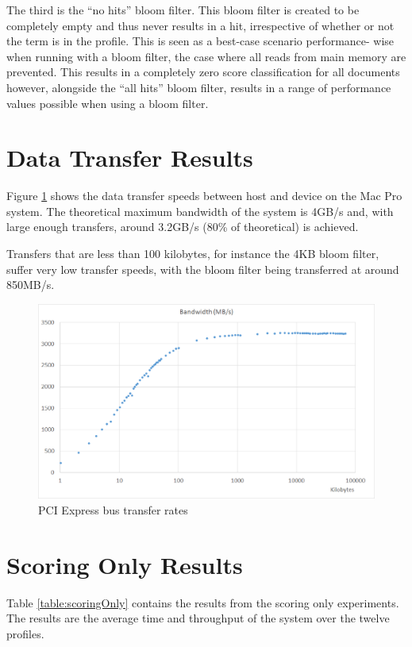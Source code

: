 The third is the ``no hits'' bloom filter. This bloom filter is created to be
completely empty and thus never results in a hit, irrespective of whether or not
the term is in the profile. This is seen as a best-case scenario performance-
wise when running with a bloom filter, the case where all reads from main memory
are prevented. This results in a completely zero score classification for all
documents however, alongside the ``all hits'' bloom filter, results in a range
of performance values possible when using a bloom filter.

\section{Data Transfer Results}

Figure \ref{fig:dataTransfer} shows the data transfer speeds between host and
device on the Mac Pro system. The theoretical maximum bandwidth of the system is
4GB/s and, with large enough transfers, around 3.2GB/s (80\% of theoretical)
is achieved.

Transfers that are less than 100 kilobytes, for instance the 4KB bloom filter,
suffer very low transfer speeds, with the bloom filter being transferred at
around 850MB/s.

\begin{figure}[H]
\centering
\includegraphics[width=\linewidth]{images/faraBandwidth.png}
\caption{PCI Express bus transfer rates}
\label{fig:dataTransfer}
\end{figure}

\section{Scoring Only Results}

Table \ref{table:scoringOnly} contains the results from the scoring only
experiments. The results are the average time and throughput of the system over
the twelve profiles.

